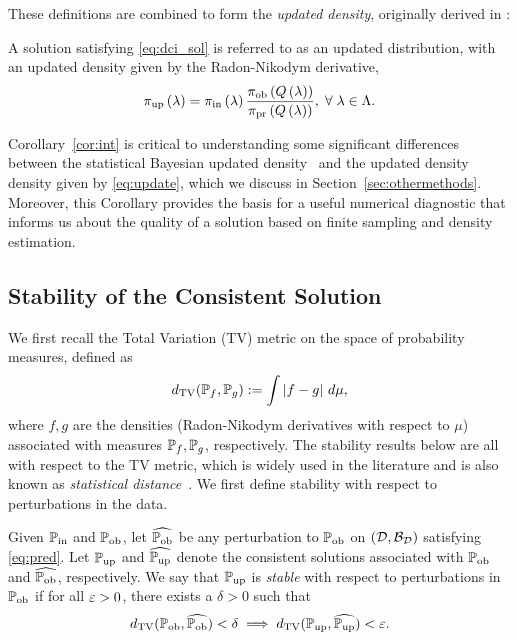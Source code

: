 These definitions are combined to form the \emph{updated density}, originally derived in \cite{BJW18}:

\begin{defn}\label{defn:updated}
  A solution satisfying \eqref{eq:dci_sol} is referred to as an updated distribution, with an updated density given by the Radon-Nikodym derivative,
  \begin{equation}\label{eq:update}
    \operatorname*{\pi_{up}} \left ( \lambda \right ) = \operatorname*{\pi_{in}} \left ( \lambda \right ) \frac{\operatorname*{\pi_{ob}} \left ( Q\left ( \lambda \right ) \right ) }{\operatorname*{\pi_{pr}} \left ( Q\left ( \lambda \right ) \right ) }, \; \forall \; \lambda \in {\Lambda}.
  \end{equation}
\end{defn}

Corollary~\ref{cor:int} is critical to understanding some significant differences between the statistical Bayesian updated density~\cite{Smith} and the updated density density given by \eqref{eq:update}, which we discuss in Section~\ref{sec:othermethods}.
Moreover, this Corollary provides the basis for a useful numerical diagnostic that informs us about the quality of a solution based on finite sampling and density estimation.



\subsection{Stability of the Consistent Solution}\label{sec:stability}

We first recall the Total Variation (TV) metric on the space of probability measures, defined as
\begin{equation}\label{eq:tv}
d_{\text{TV}} (\mathbb{P}_f, \mathbb{P}_g) := \int \left\vert f - g\right\vert \, d\mu,
\end{equation}
where $f,g$ are the densities (Radon-Nikodym derivatives with respect to $\mu$) associated with measures $\mathbb{P}_f, \mathbb{P}_g$, respectively.
The stability results below are all with respect to the TV metric, which is widely used in the literature and is also known as \emph{statistical distance}~\cite{GS02, Smith, Silverman}.
We first define stability with respect to perturbations in the data.

\begin{defn}\label{defn:stableobs}
  Given $\operatorname*{\mathbb{P}_{in}}$ and $\operatorname*{\mathbb{P}_{ob}}$, let $\widehat{\operatorname*{\mathbb{P}_{ob}}}$ be any perturbation to $\operatorname*{\mathbb{P}_{ob}}$ on $(\mathcal{D}, \mathcal{B}_{\mathcal{D}})$ satisfying \eqref{eq:pred}.
  Let $\operatorname*{\mathbb{P}_{up}}$ and $\widehat{\operatorname*{\mathbb{P}_{up}}}$ denote the consistent solutions associated with $\operatorname*{\mathbb{P}_{ob}}$ and $\widehat{\operatorname*{\mathbb{P}_{ob}}}$, respectively.
  We say that $\operatorname*{\mathbb{P}_{up}}$ is \emph{stable} with respect to perturbations in $\operatorname*{\mathbb{P}_{ob}}$ if for all $\varepsilon > 0$, there exists a $\delta > 0$ such that
  \begin{equation}
    d_{\text{TV}} (\operatorname*{\mathbb{P}_{ob}}, \widehat{\operatorname*{\mathbb{P}_{ob}}}) < \delta \implies d_{\text{TV}} (\operatorname*{\mathbb{P}_{up}}, \widehat{\operatorname*{\mathbb{P}_{up}}}) < \varepsilon.
  \end{equation}
\end{defn}

